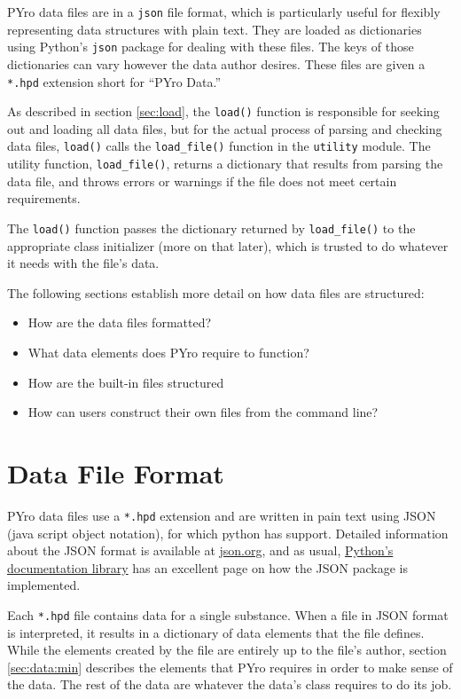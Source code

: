 PYro data files are in a \verb|json| file format, which is particularly useful for flexibly representing data structures with plain text.  They are loaded as dictionaries using Python's \verb|json| package for dealing with these files.  The keys of those dictionaries can vary however the data author desires.  These files are given a \verb|*.hpd| extension short for ``PYro Data.''

As described in section \ref{sec:load}, the \verb|load()| function is responsible for seeking out and loading all data files, but for the actual process of parsing and checking data files, \verb|load()| calls the \verb|load_file()| function in the \verb|utility| module.  The utility function, \verb|load_file()|, returns a dictionary that results from parsing the data file, and throws errors or warnings if the file does not meet certain requirements.

The \verb|load()| function passes the dictionary returned by \verb|load_file()| to the appropriate class initializer (more on that later), which is trusted to do whatever it needs with the file's data.

The following sections establish more detail on how data files are structured:
\begin{itemize}
\item How are the data files formatted? 
\item What data elements does PYro require to function?
\item How are the built-in files structured
\item How can users construct their own files from the command line?
\end{itemize}



\section{Data File Format}
PYro data files use a \verb|*.hpd| extension and are written in pain text using JSON (java script object notation), for which python has support.  Detailed information about the JSON format is available at \href{json.org}{json.org}, and as usual, \href{https://docs.python.org/2/library/json.html}{Python's documentation library} has an excellent page on how the JSON package is implemented.

Each \verb|*.hpd| file contains data for a single substance.  When a file in JSON format is interpreted, it results in a dictionary of data elements that the file defines.  While the elements created by the file are entirely up to the file's author, section \ref{sec:data:min} describes the elements that PYro requires in order to make sense of the data.  The rest of the data are whatever the data's class requires to do its job.

